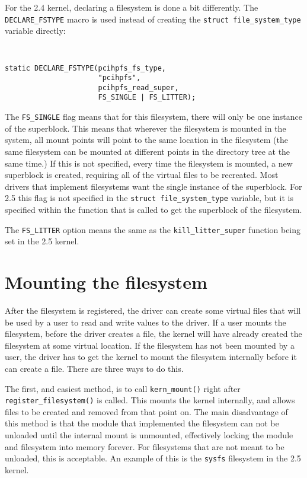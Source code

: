 \documentclass[twocolumn]{article}
\begin{document}
For the 2.4 kernel, declaring a filesystem is done a bit differently.  The
{\tt DECLARE\_FSTYPE} macro is used instead of creating the {\tt struct
file\_system\_type} variable directly:
{\tt \small
\begin{verbatim}
static DECLARE_FSTYPE(pcihpfs_fs_type,
                      "pcihpfs",
                      pcihpfs_read_super,
                      FS_SINGLE | FS_LITTER);
\end{verbatim}
}
The {\tt FS\_SINGLE} flag means that for this filesystem, there will only
be one instance of the superblock. This means that wherever the filesystem is
mounted in the system, all mount points will point to the same location in
the filesystem (the same filesystem can be mounted at different points in
the directory tree at the same time.)  If this is not specified, every
time the filesystem is mounted, a new superblock is created, requiring all
of the virtual files to be recreated.  Most drivers that implement
filesystems want the single instance of the superblock.  For 2.5 this flag
is not specified in the {\tt struct file\_system\_type} variable, but it is
specified within the function that is called to get the superblock of the
filesystem.

The {\tt FS\_LITTER} option means the same as the {\tt kill\_litter\_super}
function being set in the 2.5 kernel.



\section{Mounting the filesystem}

After the filesystem is registered, the driver can create some virtual
files that will be used by a user to read and write values to the driver.
If a user mounts the filesystem, before the driver creates a file,
the kernel will have already created the filesystem at some virtual
location.  If the filesystem has not been mounted by a user, the driver has
to get the kernel to mount the filesystem internally before it can create a
file.  There are three ways to do this.

The first, and easiest method, is to call {\tt kern\_mount()} right after
{\tt register\_filesystem()} is called.  This mounts the kernel internally,
and allows files to be created and removed from that point on.  The main
disadvantage of this method is that the module that implemented the
filesystem can not be unloaded until the internal mount is unmounted,
effectively locking the module and filesystem into memory forever.  For
filesystems that are not meant to be unloaded, this is acceptable.  An
example of this is the {\tt sysfs} filesystem in the 2.5 kernel.
\end{document}
